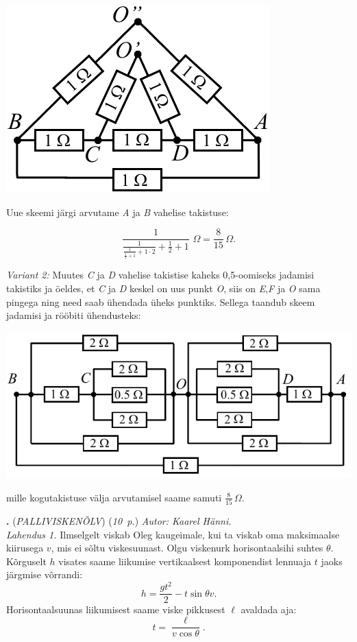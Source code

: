 \documentclass[11pt,a5paper]{article}
\newcommand{\numb}[1]{\vspace{5pt}\textbf{\large #1}}
\newcommand{\nimi}[1]{(\textsl{\small #1})}
\newcommand{\punktid}[1]{(\emph{#1~p.})}
\newcounter{ylesanne}
\newcommand{\yl}[1]{\addtocounter{ylesanne}{1}\numb{\theylesanne.} \nimi{#1} \newblock{}}
\newcommand{\autor}[1]{\emph{ Autor: #1.\\}}
\begin{document}
\begin{center}
\includegraphics[scale=0.8]{gloobus3.pdf}\\
\end{center}
Uue skeemi järgi arvutame \emph{A} ja \emph{B} vahelise takistuse:

$$ \frac{1}{\frac{1}{\displaystyle{\frac{1}{\frac{1}{2}+1} + 1 \cdot 2}}+\frac{1}{2}  + 1} \,\, \SI{}\Omega =\frac{8}{15} \, \SI{}\Omega.$$

\emph{Variant 2:} Muutes \emph{C} ja \emph{D} vahelise takistise kaheks 0,5-oomiseks jadamisi takistiks ja öeldes, et \emph{C} ja \emph{D} keskel on uus punkt \emph{O}, siis on \emph{E},\emph{F} ja \emph{O} sama pingega ning need saab ühendada üheks punktiks. Sellega taandub skeem jadamisi ja rööbiti ühendusteks:
\begin{center}
\includegraphics[scale=0.9]{gloobus4.pdf}\\
\end{center}
mille kogutakistuse välja arvutamisel saame samuti $\frac{8}{15} \, \SI{}\Omega$.


\yl{PALLIVISKENÕLV}
\punktid{10}
\autor{Kaarel Hänni}
\emph{Lahendus 1.}
Ilmselgelt viskab Oleg kaugeimale, kui ta viskab oma maksimaalse kiirusega $v$, mis ei sõltu viskesuunast. Olgu viskenurk horisontaalsihi suhtes $\theta$. Kõrguselt $h$ visates saame liikumise vertikaalsest komponendist lennuaja $t$ jaoks järgmise võrrandi:
\[h=\frac{gt^2}{2}-t\sin \theta v.\]
Horisontaalsuunas liikumisest saame viske pikkusest $\ell$ avaldada aja:
\[t=\frac{\ell}{v\cos \theta}.\]
\end{document}
